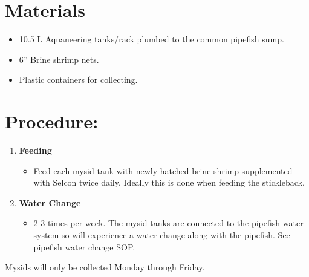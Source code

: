 \documentclass[
  letterpaper,
  DIV=11,
  numbers=noendperiod]{scrreprt}
\providecommand{\tightlist}{%
  \setlength{\itemsep}{0pt}\setlength{\parskip}{0pt}}\usepackage{longtable,booktabs,array}
\begin{document}
\hypertarget{materials-13}{%
\section{Materials}\label{materials-13}}

\begin{itemize}
\tightlist
\item
  10.5 L Aquaneering tanks/rack plumbed to the common pipefish sump.
\item
  6'' Brine shrimp nets.
\item
  Plastic containers for collecting.
\end{itemize}

\hypertarget{procedure-14}{%
\section{Procedure:}\label{procedure-14}}

\begin{enumerate}
\def\labelenumi{\arabic{enumi}.}
\tightlist
\item
  \textbf{Feeding}

  \begin{itemize}
  \tightlist
  \item
    Feed each mysid tank with newly hatched brine shrimp supplemented
    with Selcon twice daily. Ideally this is done when feeding the
    stickleback.
  \end{itemize}
\item
  \textbf{Water Change}

  \begin{itemize}
  \tightlist
  \item
    2-3 times per week. The mysid tanks are connected to the pipefish
    water system so will experience a water change along with the
    pipefish. See pipefish water change SOP.
  \end{itemize}
\end{enumerate}

\begin{tcolorbox}[enhanced jigsaw, bottomtitle=1mm, rightrule=.15mm, toptitle=1mm, opacitybacktitle=0.6, bottomrule=.15mm, titlerule=0mm, coltitle=black, leftrule=.75mm, arc=.35mm, colback=white, colframe=quarto-callout-note-color-frame, left=2mm, colbacktitle=quarto-callout-note-color!10!white, title=\textcolor{quarto-callout-note-color}{\faInfo}\hspace{0.5em}{This is a callout NOTE}, toprule=.15mm, opacityback=0, breakable]

Mysids will only be collected Monday through Friday.

\end{tcolorbox}
\end{document}
